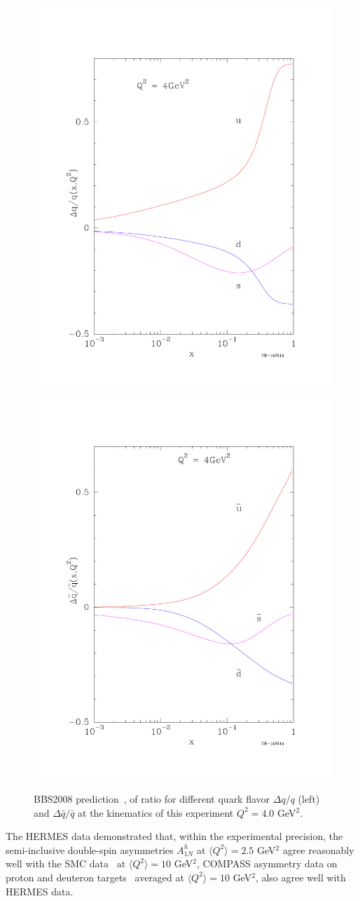\begin{figure} [htbp]
  \centering
    \includegraphics[width=0.49\linewidth]{figs_xj/BBS_deltaqoq.pdf}
    \includegraphics[width=0.49\linewidth]{figs_xj/BBS_deltaqbaroqbar.pdf} \\
  \caption{\label{fig:BBS_deltaqoq} BBS2008 prediction~\cite{Bourrely200739}, of ratio for different quark flavor $\Delta q/q$  (left) and $\Delta \bar{q}/\bar{q}$ at the kinematics of this experiment $Q^2=4.0$ GeV$^2$.  }
\end{figure}

The HERMES data demonstrated that, within the experimental precision, 
the semi-inclusive double-spin asymmetries $A_{1N}^h$ 
at $\langle Q^2 \rangle=2.5$ GeV$^2$ 
agree reasonably well with the 
SMC data~\cite{Adeva:1997qz} at $\langle Q^2 \rangle=10$ GeV$^2$, COMPASS 
asymmetry data on proton and deuteron targets~\cite{Alekseev:2010ub}
averaged at $\langle Q^2 \rangle=10$ GeV$^2$, also agree well with HERMES data.

